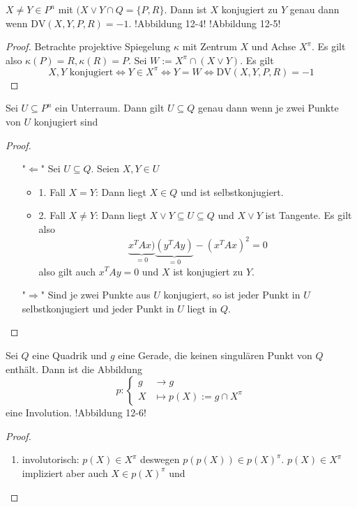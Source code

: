 \documentclass[11pt]{article}
\begin{document}
\begin{theorem}
$X\neq Y\in P^n$ mit $(X\lor Y\cap Q = \{P,R\}$. Dann ist $X$ konjugiert zu $Y$ genau dann wenn $\mathrm{DV}(X,Y,P,R) = -1$. !Abbildung 12-4! !Abbildung 12-5!
\end{theorem}
\begin{proof}
Betrachte projektive Spiegelung $\kappa$ mit Zentrum $X$ und Achse $X^\pi$. Es gilt also $\kappa(P) = R, \kappa(R) = P$. Sei $W:= X^\pi\cap (X\lor Y)$. Es gilt \begin{equation*}
    X,Y \text{ konjugiert} \Longleftrightarrow Y\in X^\pi \Longleftrightarrow Y = W \Longleftrightarrow \mathrm{DV}(X,Y,P,R) = -1
\end{equation*}
\end{proof}
\begin{theorem}
Sei $U\subseteq P^n$ ein Unterraum. Dann gilt $U\subseteq Q$ genau dann wenn je zwei Punkte von $U$ konjugiert sind
\end{theorem}
\begin{proof}
\begin{enumerate}
    \item ["$\Leftarrow$"] Sei $U\subseteq Q$. Seien $X,Y\in U$
       \begin{itemize}
           \item 1. Fall $X= Y$: Dann liegt $X\in Q$ und ist selbstkonjugiert.
           \item 2. Fall $X\neq Y$: Dann  liegt $X\lor Y \subseteq U\subseteq Q$ und $X\lor Y$ ist Tangente. Es gilt also \begin{equation*}
               \underbrace{x^TAx)}_{=0}\underbrace{(y^TAy)}_{=0} - (x^TAx)^2 = 0
           \end{equation*}
           also gilt auch $x^TAy=0$ und $X$ ist konjugiert zu $Y$.
       \end{itemize}
   \item ["$\Rightarrow$"] Sind je zwei Punkte aus $U$ konjugiert, so ist jeder Punkt in $U$ selbstkonjugiert und jeder Punkt in $U$ liegt in $Q$.
\end{enumerate}
\end{proof}
\begin{theorem}
Sei $Q$ eine Quadrik und $g$ eine Gerade, die keinen singulären Punkt von $Q$ enthält. Dann ist die Abbildung \begin{equation*}
    p: \begin{cases}g&\to g\\ X&\mapsto p(X):= g\cap X^\pi\end{cases}
\end{equation*}
eine Involution. !Abbildung 12-6!
\end{theorem}
\begin{proof}
\begin{enumerate}
    \item involutorisch: $p(X)\in X^\pi$ deswegen $p(p(X))\in p(X)^\pi$. $p(X)\in X^\pi$ impliziert aber auch $X\in p(X)^\pi$ und 
\end{enumerate}
\end{proof}
\end{document}

